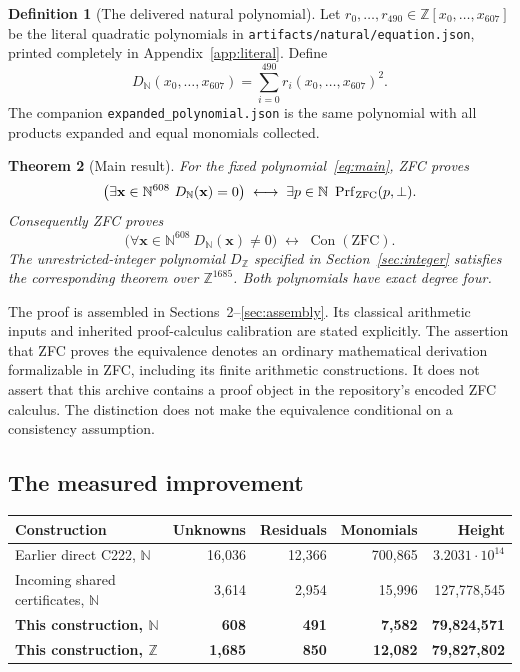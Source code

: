 \documentclass[11pt,letterpaper]{article}
\newcommand{\N}{\mathbb N}
\newcommand{\Z}{\mathbb Z}
\newcommand{\Con}{\operatorname{Con}}
\newtheorem{theorem}{Theorem}[section]
\theoremstyle{definition}\newtheorem{definition}[theorem]{Definition}
\theoremstyle{remark}\newtheorem{remark}[theorem]{Remark}
\begin{document}
\begin{definition}[The delivered natural polynomial]
Let $r_0,\ldots,r_{490}\in\Z[x_0,\ldots,x_{607}]$ be the literal quadratic
polynomials in \texttt{artifacts/natural/equation.json}, printed completely
in Appendix~\ref{app:literal}. Define
\begin{equation}\label{eq:main}
 \boxed{D_{\N}(x_0,\ldots,x_{607})
      =\sum_{i=0}^{490} r_i(x_0,\ldots,x_{607})^2.}
\end{equation}
The companion \texttt{expanded\_polynomial.json} is the same polynomial
with all products expanded and equal monomials collected.
\end{definition}

\begin{theorem}[Main result]\label{thm:main}
For the fixed polynomial~\eqref{eq:main}, ZFC proves
\[
 \bigl(\exists\mathbf x\in\N^{608}\ D_{\N}(\mathbf x)=0\bigr)
 \;\longleftrightarrow\;
 \exists p\in\N\ \operatorname{Prf}_{\rm ZFC}(p,\bot).
\]
Consequently ZFC proves
\[
 \boxed{\bigl(\forall\mathbf x\in\N^{608}\ D_{\N}(\mathbf x)\ne0\bigr)
         \;\longleftrightarrow\;\Con(\mathrm{ZFC}).}
\]
The unrestricted-integer polynomial $D_{\Z}$ specified in
Section~\ref{sec:integer} satisfies the corresponding theorem over
$\Z^{1685}$. Both polynomials have exact degree four.
\end{theorem}

The proof is assembled in Sections~2--\ref{sec:assembly}. Its classical
arithmetic inputs and inherited proof-calculus calibration are stated
explicitly. The assertion that ZFC proves the equivalence denotes an ordinary
mathematical derivation formalizable in ZFC, including its finite arithmetic
constructions. It does not assert that this archive contains a proof object
in the repository's encoded ZFC calculus. The distinction does not make the
equivalence conditional on a consistency assumption.

\subsection{The measured improvement}

\begin{center}\small
\begin{tabular}{lrrrr}
\toprule
Construction & Unknowns & Residuals & Monomials & Height\\
\midrule
Earlier direct C222, $\N$ &16,036&12,366&700,865&$3.2031\cdot10^{14}$\\
Incoming shared certificates, $\N$ &3,614&2,954&15,996&127,778,545\\
\textbf{This construction, $\N$}&\textbf{608}&\textbf{491}&\textbf{7,582}&\textbf{79,824,571}\\
\textbf{This construction, $\Z$}&\textbf{1,685}&\textbf{850}&\textbf{12,082}&\textbf{79,827,802}\\
\bottomrule
\end{tabular}
\end{center}
\end{document}

